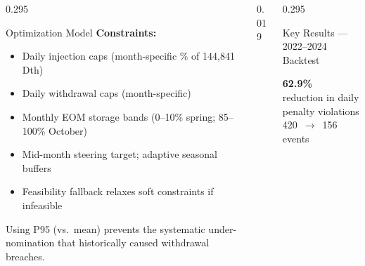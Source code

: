 \documentclass[final]{beamer}
\begin{document}
\begin{frame}[t]{}
\begin{columns}[T]
\begin{column}{0.295\paperwidth}
\begin{pbox}{Optimization Model}
      \vspace{0.4cm}
      \textbf{Constraints:}
      \begin{itemize}
        \item Daily injection caps (month-specific \% of 144,841 Dth)
        \item Daily withdrawal caps (month-specific)
        \item Monthly EOM storage bands (0–10\% spring; 85–100\% October)
        \item Mid-month steering target; adaptive seasonal buffers
        \item Feasibility fallback relaxes soft constraints if infeasible
      \end{itemize}
      Using P95 (vs.\ mean) prevents the systematic under-nomination
      that historically caused withdrawal breaches.
    \end{pbox}

  \end{column}

  \begin{column}{0.019\paperwidth}\end{column}

  \begin{column}{0.295\paperwidth}

    \begin{pbox}{Key Results — 2022–2024 Backtest}

      \begin{bigkpi}
        \centering
        {\fontsize{74}{78}\selectfont\bfseries\color{resultgreen} 62.9\%}\\[0.2cm]
        {\large\color{white} reduction in daily penalty violations}\\[0.1cm]
        {\normalsize\color{lightblue} 420\ $\rightarrow$\ 156 events}
      \end{bigkpi}


\end{pbox}
\end{column}
\end{columns}
\end{frame}
\end{document}
